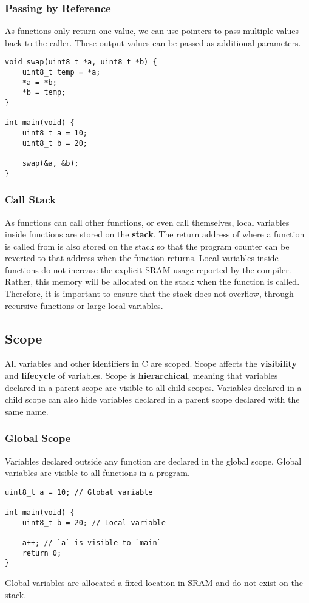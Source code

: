 \documentclass{article}
\begin{document}
\subsubsection{Passing by Reference}
As functions only return one value, we can use pointers to pass
multiple values back to the caller. These output values can be passed as
additional parameters.
\begin{verbatim}
void swap(uint8_t *a, uint8_t *b) {
    uint8_t temp = *a;
    *a = *b;
    *b = temp;
}

int main(void) {
    uint8_t a = 10;
    uint8_t b = 20;

    swap(&a, &b);
}
\end{verbatim}
\subsubsection{Call Stack}
As functions can call other functions, or even call themselves, local
variables inside functions are stored on the \textbf{stack}. The return
address of where a function is called from is also stored on the stack
so that the program counter can be reverted to that address when the
function returns.
Local variables inside functions do not increase the explicit SRAM
usage reported by the compiler. Rather, this memory will be allocated
on the stack when the function is called. Therefore, it is important to
ensure that the stack does not overflow, through recursive functions or
large local variables.
\subsection{Scope}
All variables and other identifiers in C are scoped. Scope affects the
\textbf{visibility} and \textbf{lifecycle} of variables. Scope is
\textbf{hierarchical}, meaning that variables declared in a parent
scope are visible to all child scopes. Variables declared in a child
scope can also hide variables declared in a parent scope declared with
the same name.
\subsubsection{Global Scope}
Variables declared outside any function are declared in the global
scope. Global variables are visible to all functions in a program.
\begin{verbatim}
uint8_t a = 10; // Global variable

int main(void) {
    uint8_t b = 20; // Local variable

    a++; // `a` is visible to `main`
    return 0;
}
\end{verbatim}
Global variables are allocated a fixed location in SRAM and do not
exist on the stack.
\end{document}
